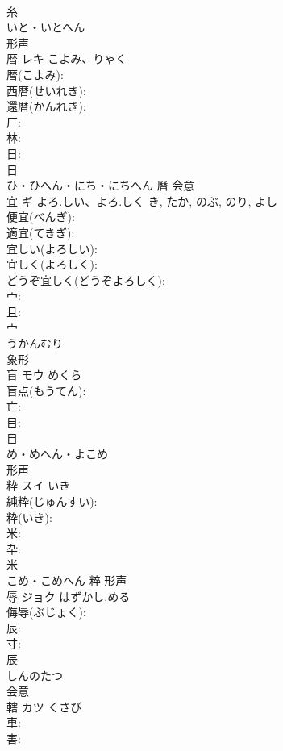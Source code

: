 \documentclass[8pt]{extreport}
\begin{document}
\begin{CJK}{UTF8}{min}
\\	糸	
\\	いと・いとへん	
\\	形声 
\\	暦	レキ	こよみ、りゃく		
\\	暦(こよみ): 
\\	西暦(せいれき): 
\\	還暦(かんれき): 
\\	厂: 
\\	林: 
\\	日: 
\\	日	
\\	ひ・ひへん・にち・にちへん	曆	会意 
\\	宜	ギ	よろ.しい、よろ.しく	き, たか, のぶ, のり, よし	
\\	便宜(べんぎ): 
\\	適宜(てきぎ): 
\\	宜しい(よろしい): 
\\	宜しく(よろしく): 
\\	どうぞ宜しく(どうぞよろしく): 
\\	宀: 
\\	且: 
\\	宀	
\\	うかんむり	
\\	象形 
\\	盲	モウ	めくら		
\\	盲点(もうてん): 
\\	亡: 
\\	目: 
\\	目	
\\	め・めへん・よこめ	
\\	形声 
\\	粋	スイ	いき		
\\	純粋(じゅんすい): 
\\	粋(いき): 
\\	米: 
\\	卆: 
\\	米	
\\	こめ・こめへん	粹	形声 
\\	辱	ジョク	はずかし.める		
\\	侮辱(ぶじょく): 
\\	辰: 
\\	寸: 
\\	辰	
\\	しんのたつ	
\\	会意 
\\	轄	カツ	くさび		
\\	車: 
\\	害: 

\end{CJK}
\end{document}
